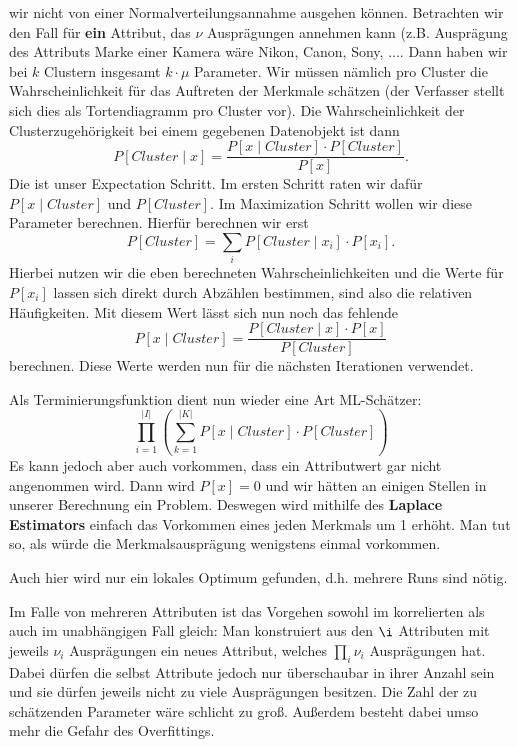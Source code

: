 wir nicht von einer Normalverteilungsannahme ausgehen können. Betrachten wir
den Fall für \textbf{ein} Attribut, das \(\nu\) Ausprägungen annehmen kann
(z.B. Ausprägung des Attributs Marke einer Kamera wäre Nikon, Canon, Sony,
 \(\dots\). Dann haben wir bei \(k\) Clustern insgesamt \(k \cdot \mu\) Parameter.
 Wir müssen nämlich pro Cluster die Wahrscheinlichkeit für das Auftreten der
 Merkmale schätzen (der Verfasser stellt sich dies als Tortendiagramm pro Cluster
 vor). Die Wahrscheinlichkeit der Clusterzugehörigkeit bei einem gegebenen 
 Datenobjekt ist dann
 \[ P[Cluster \mid x] = \frac{P[x \mid Cluster] \cdot P[Cluster]}{P[x]}.\]
 Die ist unser Expectation Schritt. Im ersten Schritt raten wir dafür 
 \(P[x \mid Cluster]\) und \(P[Cluster]\). Im Maximization Schritt wollen
 wir diese Parameter berechnen. Hierfür berechnen wir erst
 \[ P[Cluster] = \sum_i P[Cluster \mid x_i] \cdot P[x_i].\]
 Hierbei nutzen wir die eben berechneten Wahrscheinlichkeiten und die 
 Werte für \(P[x_i]\) lassen sich direkt durch Abzählen bestimmen, sind
 also die relativen Häufigkeiten. Mit diesem Wert lässt sich nun noch das 
 fehlende
 \[P[x \mid Cluster] = \frac{P[Cluster \mid x] \cdot P[x]}{P[Cluster]}\]
 berechnen. Diese Werte werden nun für die nächsten Iterationen verwendet.
 
 Als Terminierungsfunktion dient nun wieder eine Art ML-Schätzer:
 \[\prod_{i=1}^{|I|}\left( \sum_{k=1}^{|K|}
 P[x \mid Cluster] \cdot P[Cluster] \right)\]
 Es kann jedoch aber auch vorkommen, dass ein Attributwert gar nicht
 angenommen wird. Dann wird \(P[x] = 0\) und wir hätten an einigen
 Stellen in unserer Berechnung ein Problem. Deswegen wird mithilfe des
 \textbf{Laplace Estimators} einfach das Vorkommen eines jeden Merkmals um
 1 erhöht. Man tut so, als würde die Merkmalsausprägung wenigstens einmal
 vorkommen.
 
 Auch hier wird nur ein lokales Optimum gefunden, d.h. mehrere Runs sind nötig.

 Im Falle von mehreren Attributen ist das Vorgehen sowohl im korrelierten als auch
 im unabhängigen Fall gleich: Man konstruiert aus den \(\i\) Attributen mit %
 jeweils \(\nu_i\) Ausprägungen ein neues Attribut, welches \(\prod_i \nu_i\) 
 Ausprägungen hat. Dabei dürfen die selbst Attribute jedoch nur überschaubar
 in ihrer Anzahl sein und sie dürfen jeweils nicht zu viele Ausprägungen besitzen.
 Die Zahl der zu schätzenden Parameter wäre schlicht zu groß. Außerdem besteht
 dabei umso mehr die Gefahr des Overfittings. 
 
